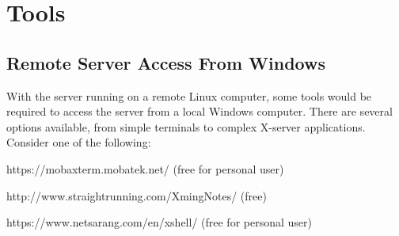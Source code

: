 \chapter{Tools}
\label{chap:Tools}

\section{Remote Server Access From Windows}
\label{sec:RemoteServerAccessFromWindows}

With the \libraddask{} server running on a remote Linux computer, some tools would be required to access the server from a local Windows computer.  There are several options available, from simple terminals to complex X-server applications.  Consider one of the following:


https://mobaxterm.mobatek.net/ (free for personal user) 

http://www.straightrunning.com/XmingNotes/ (free)

https://www.netsarang.com/en/xshell/ (free for personal user) 

